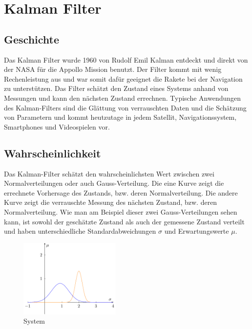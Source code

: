 %
%
%
%
%
%


\section{Kalman Filter}
\subsection{Geschichte}
Das Kalman Filter wurde 1960 von Rudolf Emil Kalman entdeckt und direkt von der NASA für die Appollo Mission benutzt. Der Filter kommt mit wenig Rechenleistung aus und war somit dafür geeignet die Rakete bei der Navigation zu unterstützen. Das Filter schätzt den Zustand eines Systems anhand von Messungen und kann den nächsten Zustand errechnen. Typische Anwendungen des Kalman-Filters sind die Glättung von verrauschten Daten und die Schätzung von Parametern und kommt heutzutage in jedem Satellit, Navigationssystem, Smartphones und Videospielen vor.

\subsection{Wahrscheinlichkeit}
Das Kalman-Filter schätzt den wahrscheinlichsten Wert zwischen zwei Normalverteilungen oder auch Gauss-Verteilung. Die eine Kurve zeigt die errechnete Vorhersage des Zustands, bzw. deren Normalverteilung. Die andere Kurve zeigt die verrauschte Messung des nächsten Zustand, bzw. deren Normalverteilung. Wie man am Beispiel dieser zwei Gauss-Verteilungen sehen kann, ist sowohl der geschätzte Zustand als auch der gemessene Zustand verteilt und haben unterschiedliche Standardabweichungen $\sigma$ und Erwartungswerte $\mu$.



\begin{figure}
 \begin{center}
 \includegraphics[width=5cm]{papers/erdbeben/Gausskurve2.pdf}
 \caption{System}
 \end{center}
\end{figure}



